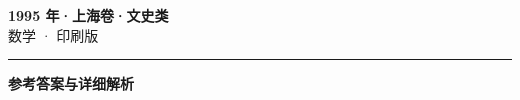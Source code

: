 \documentclass[zihao=5, a4paper]{ctexart}
\begin{document}
\begin{center}
  {\Large\bfseries 1995 年·上海卷·文史类}\\[4pt]
  {\large 数学 · 印刷版}
\end{center}
\medskip
{}

\par\bigskip\hrule\bigskip
{}
\begin{center}{\large\bfseries 参考答案与详细解析}\end{center}
\smallskip

\end{document}
